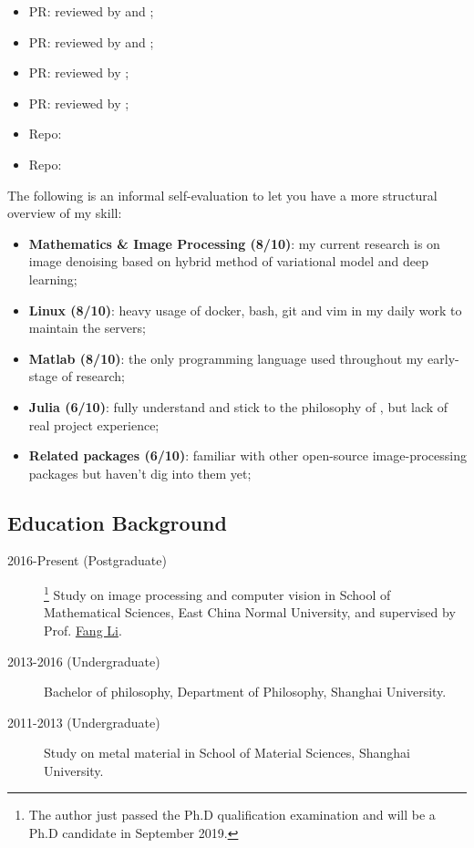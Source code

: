 \begin{itemize}
    \item PR:  reviewed by \evizero and \timholy;
    \item PR:  reviewed by \evizero and \timholy;
    \item PR:  reviewed by \mbauman;
    \item PR:  reviewed by \mikeinnes;
    \item Repo: \repodeeplearningtutorial
    \item Repo: \repodipcode
\end{itemize}

The following is an informal self-evaluation to let you have a more structural overview of my skill:

\begin{itemize}
    \item \textbf{Mathematics \& Image Processing (8/10)}: my current research is on image denoising based on hybrid method of variational model and deep learning;
    \item \textbf{Linux (8/10)}: heavy usage of docker, bash, git and vim in my daily work to maintain the servers;
    \item \textbf{Matlab (8/10)}: the only programming language used throughout my early-stage of research;
    \item \textbf{Julia (6/10)}: fully understand and stick to the philosophy of \langjulia, but lack of real project experience;
    \item \textbf{Related packages (6/10)}: familiar with other open-source image-processing packages but haven't dig into them yet;
\end{itemize}


\subsection{Education Background}

\begin{description}
    \item[2016-Present (Postgraduate)]\footnote{The author just passed the Ph.D qualification examination and will be a Ph.D candidate in September 2019.} Study on image processing and computer vision in School of Mathematical Sciences, East China Normal University, and supervised by Prof. \href{http://math.ecnu.edu.cn/~fli/}{\textsf{Fang Li}}.
    \item[2013-2016 (Undergraduate)] Bachelor of philosophy, Department of Philosophy, Shanghai University.
    \item[2011-2013 (Undergraduate)] Study on metal material in School of Material Sciences, Shanghai University.
\end{description}
